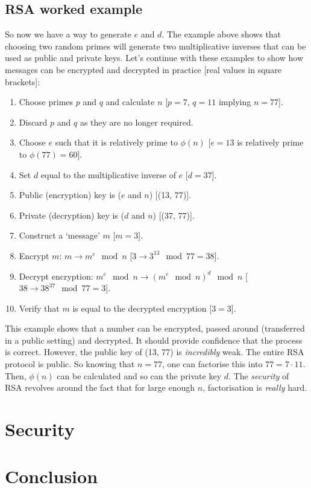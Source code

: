 \documentclass[]{scrartcl}
\theoremstyle{definition}
\begin{document}
\subsection{RSA worked example}
So now we have a way to generate $e$ and $d$. The example above shows that choosing two random primes will generate two multiplicative inverses that can be used as public and private keys. Let's continue with these examples to show how messages can be encrypted and decrypted in practice [real values in square brackets]:
\begin{enumerate}
    \item Choose primes $p$ and $q$ and calculate $n$ [$p=7$, $q=11$ implying $n=77$].
    \item Discard $p$ and $q$ as they are no longer required.
    \item Choose $e$ such that it is relatively prime to $\phi(n)$ [$e=13$ is relatively prime to $\phi(77)=60$].
    \item Set $d$ equal to the multiplicative inverse of $e$ [$d = 37$].
    \item Public (encryption) key is ($e$ and $n$) [(13, 77)].
    \item Private (decryption) key is ($d$ and $n$) [(37, 77)].
    \item Construct a `message' $m$ [$m=3$].
    \item Encrypt $m$: $m \rightarrow m^e \mod n$ [$3 \rightarrow 3^{13} \mod 77 = 38$].
    \item Decrypt encryption: $m^e \mod n \rightarrow (m^e \mod n)^d \mod n$ [$38 \rightarrow 38^{37}\mod 77 = 3$].
    \item Verify that $m$ is equal to the decrypted encryption [$3=3$].
\end{enumerate}
This example shows that a number can be encrypted, passed around (transferred in a public setting) and decrypted. It should provide confidence that the process is correct. However, the public key of (13, 77) is \textit{incredibly} weak. The entire RSA protocol is public. So knowing that $n=77$, one can factorise this into $77=7\cdot11$. Then, $\phi(n)$ can be calculated and so can the private key $d$. The \textit{security} of RSA revolves around the fact that for large enough $n$, factorisation is \textit{really} hard.

\section{Security}

\section{Conclusion}
\end{document}
